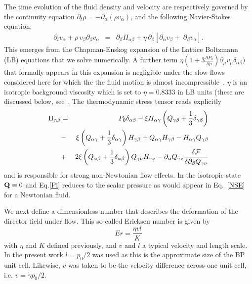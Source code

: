 \documentclass[aps,pre,reprint,superscriptaddress, twocolumn]{revtex4}
\begin{document}
The time evolution of the fluid density and velocity are respectively governed
by the continuity equation
$\partial_t \rho = -\partial_\alpha(\rho v_\alpha)$, and
the following Navier-Stokes equation:
\begin{eqnarray}
\partial_t v_\alpha +\rho \,v_\beta \partial_\beta v_\alpha
&=& \partial_\beta \Pi_{\alpha \beta}+ \eta\, \partial_\beta [ \partial_\alpha v_\beta +\; \partial_\beta v_\alpha].
\label{NSE}
\end{eqnarray}
This emerges from the Chapman-Enskog expansion
of the Lattice Boltzmann (LB) equations 
that we solve numerically. A further term $\eta(1+3\frac{\partial P_0}{\partial\rho} )\partial_\mu v_\mu \delta_{\alpha \beta})$ that formally appears
in this expansion is negligible under the slow flows considered here
for which the the fluid motion is almost incompressible~\cite{Denniston:2001}.
$\eta$ is an isotropic background viscosity which is set to $\eta=0.8333$ in LB units (these are discussed below, see~\cite{Henrich:2011a,Henrich:2010b}.
The thermodynamic stress tensor reads explicitly
\begin{eqnarray}
\Pi_{\alpha \beta}&=&P_0 \delta_{\alpha\beta}
-\xi H_{\alpha \gamma}\left(Q_{\gamma \beta} +\frac{1}{3} \delta_{\gamma \beta}\right)\nonumber\\
&-&\xi \left(Q_{\alpha \gamma} +\frac{1}{3} \delta_{\alpha \gamma}\right) H_{\gamma \beta} + Q_{\alpha \gamma}H_{\gamma \beta}-H_{\alpha \gamma} Q_{\gamma \beta} \nonumber\\
&+&2 \xi  \left(Q_{\alpha \beta} +\frac{1}{3} \delta_{\alpha \beta}\right) Q_{\gamma \nu} H_{\gamma \nu}
- \partial_\alpha Q_{\gamma \nu} \frac{\delta{\cal F}}{\delta \partial_{\beta} Q_{\gamma \nu}}\nonumber\\
\label{Pi}
\end{eqnarray}
and is responsible for strong non-Newtonian flow effects.
In the isotropic state ${\bf Q}\equiv 0$ and Eq.\ref{Pi} reduces to the
scalar pressure as would appear in Eq.~\ref{NSE} for a Newtonian fluid. 

We next define a 
dimensionless number that describes the deformation
of the director field under flow. This so-called Ericksen number
is given by 
\begin{equation}
Er=\frac{\eta v l}{K}
\end{equation}
with $\eta$ and $K$ defined previously, and 
$v$ and $l$ a typical velocity and length scale. 
In the present work $l=p_0/2$ was used as this is the approximate size of
the BP unit cell. Likewise, $v$ was taken to be the velocity difference
across one unit cell, i.e. $v=\dot{\gamma} p_0/2$. 
\end{document}
